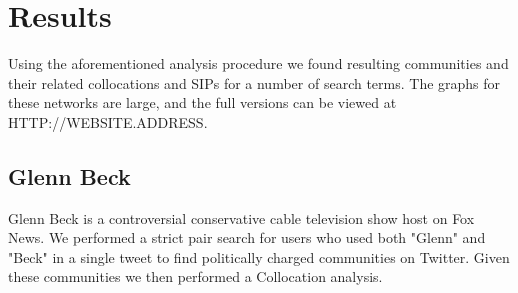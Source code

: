 \section{Results}
Using the aforementioned analysis procedure we found resulting communities and their related collocations and SIPs for a number of search terms.  The graphs for these networks are large, and the full versions can be viewed at HTTP://WEBSITE.ADDRESS.\\
\subsection{Glenn Beck}
Glenn Beck is a controversial conservative cable television show host on Fox News.  We performed a strict pair search for users who used both "Glenn" and "Beck" in a single tweet to find politically charged communities on Twitter.  Given these communities we then performed a Collocation analysis.\\ 